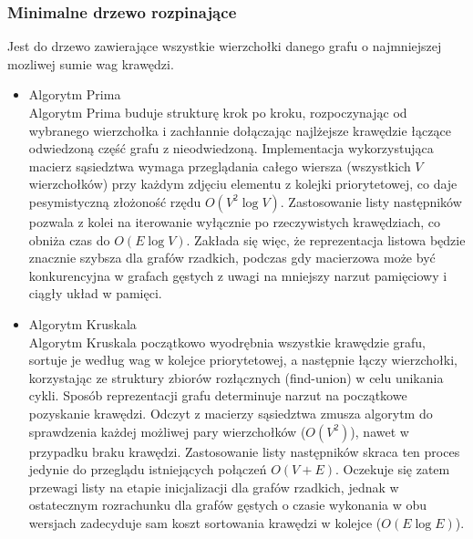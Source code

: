 \documentclass{article}
\theoremstyle{mytheoremstyle}
\theoremstyle{mytheoremstyle}
\theoremstyle{myproblemstyle}
\begin{document}
    \subsubsection{Minimalne drzewo rozpinające}
      Jest do drzewo zawierające wszystkie wierzchołki danego grafu o najmniejszej mozliwej sumie wag krawędzi.
      \begin{itemize}
      \item{Algorytm Prima}\\
        Algorytm Prima buduje strukturę krok po kroku, rozpoczynając od wybranego wierzchołka i zachłannie dołączając najlżejsze krawędzie łączące odwiedzoną część grafu z nieodwiedzoną. Implementacja wykorzystująca macierz sąsiedztwa wymaga przeglądania całego wiersza (wszystkich $V$ wierzchołków) przy każdym zdjęciu elementu z kolejki priorytetowej, co daje pesymistyczną złożoność rzędu $O(V^2 \log V)$. Zastosowanie listy następników pozwala z kolei na iterowanie wyłącznie po rzeczywistych krawędziach, co obniża czas do $O(E \log V)$. Zakłada się więc, że reprezentacja listowa będzie znacznie szybsza dla grafów rzadkich, podczas gdy macierzowa może być konkurencyjna w grafach gęstych z uwagi na mniejszy narzut pamięciowy i ciągły układ w pamięci.
        \cite{Prim}
      \item{Algorytm Kruskala}\\
        Algorytm Kruskala początkowo wyodrębnia wszystkie krawędzie grafu, sortuje je według wag w kolejce priorytetowej, a następnie łączy wierzchołki, korzystając ze struktury zbiorów rozłącznych (find-union) w celu unikania cykli. Sposób reprezentacji grafu determinuje narzut na początkowe pozyskanie krawędzi. Odczyt z macierzy sąsiedztwa zmusza algorytm do sprawdzenia każdej możliwej pary wierzchołków ($O(V^2)$), nawet w przypadku braku krawędzi. Zastosowanie listy następników skraca ten proces jedynie do przeglądu istniejących połączeń $O(V + E)$. Oczekuje się zatem przewagi listy na etapie inicjalizacji dla grafów rzadkich, jednak w ostatecznym rozrachunku dla grafów gęstych o czasie wykonania w obu wersjach zadecyduje sam koszt sortowania krawędzi w kolejce ($O(E \log E)$).
        \cite{Kruskal}
      \end{itemize}
\end{document}
